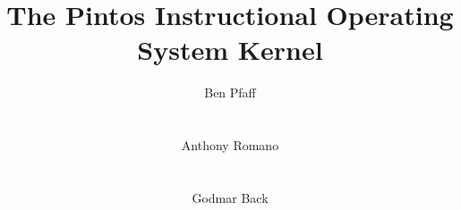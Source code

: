 \documentclass{sig-alternate}
\def\com#1{ }
\begin{document}
%

\title{The Pintos Instructional Operating System Kernel}


\author{
\alignauthor Ben Pfaff\\
       \\
       \\
\alignauthor Anthony Romano\\
       \\
       \\
\alignauthor Godmar Back\\
       \\
       \\
}
\com{
\author{
\alignauthor AnonAuthor1\\
       \affaddr{Affiliation1}\\
       \affaddr{City, State}\\
       \email{email1@edu}
\alignauthor AnonAuthor2\\
       \affaddr{Affiliation2}\\
       \affaddr{City, State}\\
       \email{email2@edu}
\alignauthor AnonAuthor3\\
       \affaddr{Affiliation3}\\
       \affaddr{City, State}\\
       \email{email3@edu}
}
}

\maketitle
\begin{abstract}

\end{abstract}

\end{document}
